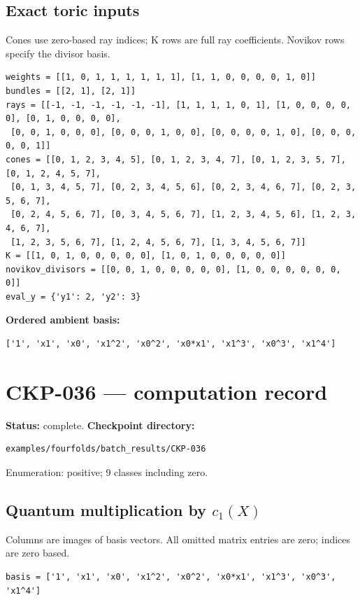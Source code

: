 \documentclass[10pt,a4paper]{article}
\begin{document}
\subsection*{Exact toric inputs}
Cones use zero-based ray indices; K rows are full ray coefficients. Novikov rows specify the divisor basis.

\begin{lstlisting}
weights = [[1, 0, 1, 1, 1, 1, 1, 1], [1, 1, 0, 0, 0, 0, 1, 0]]
bundles = [[2, 1], [2, 1]]
rays = [[-1, -1, -1, -1, -1, -1], [1, 1, 1, 1, 0, 1], [1, 0, 0, 0, 0, 0], [0, 1, 0, 0, 0, 0],
 [0, 0, 1, 0, 0, 0], [0, 0, 0, 1, 0, 0], [0, 0, 0, 0, 1, 0], [0, 0, 0, 0, 0, 1]]
cones = [[0, 1, 2, 3, 4, 5], [0, 1, 2, 3, 4, 7], [0, 1, 2, 3, 5, 7], [0, 1, 2, 4, 5, 7],
 [0, 1, 3, 4, 5, 7], [0, 2, 3, 4, 5, 6], [0, 2, 3, 4, 6, 7], [0, 2, 3, 5, 6, 7],
 [0, 2, 4, 5, 6, 7], [0, 3, 4, 5, 6, 7], [1, 2, 3, 4, 5, 6], [1, 2, 3, 4, 6, 7],
 [1, 2, 3, 5, 6, 7], [1, 2, 4, 5, 6, 7], [1, 3, 4, 5, 6, 7]]
K = [[1, 0, 1, 0, 0, 0, 0, 0], [1, 0, 1, 0, 0, 0, 0, 0]]
novikov_divisors = [[0, 0, 1, 0, 0, 0, 0, 0], [1, 0, 0, 0, 0, 0, 0, 0]]
eval_y = {'y1': 2, 'y2': 3}
\end{lstlisting}

\textbf{Ordered ambient basis:}
\begin{lstlisting}
['1', 'x1', 'x0', 'x1^2', 'x0^2', 'x0*x1', 'x1^3', 'x0^3', 'x1^4']
\end{lstlisting}

\clearpage\section*{CKP-036 --- computation record}
\textbf{Status:} complete.
\textbf{Checkpoint directory:}
\begin{lstlisting}
examples/fourfolds/batch_results/CKP-036
\end{lstlisting}

Enumeration: positive; 9 classes including zero.
\subsection*{Quantum multiplication by $c_1(X)$}
Columns are images of basis vectors. All omitted matrix entries are zero; indices are zero based.

\begin{lstlisting}
basis = ['1', 'x1', 'x0', 'x1^2', 'x0^2', 'x0*x1', 'x1^3', 'x0^3', 'x1^4']
\end{lstlisting}
\end{document}
